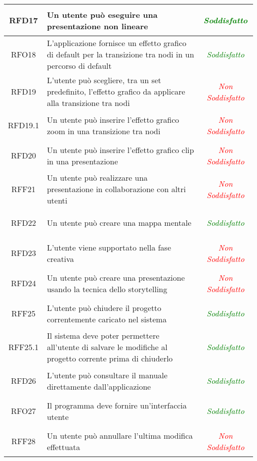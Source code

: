 \begin{longtable}{|c|>{\centering}m{7cm}|c|}
\hypertarget{RFD17}{RFD17} & Un utente può eseguire una presentazione non lineare & \textcolor{Green}{\textit{Soddisfatto}}\\ \hline
\hypertarget{RFO18}{RFO18} & L'applicazione fornisce un effetto grafico di default per la transizione tra nodi in un percorso di default & \textcolor{Green}{\textit{Soddisfatto}}\\ \hline
\hypertarget{RFD19}{RFD19} &  L'utente può scegliere, tra un set predefinito, l'effetto grafico da applicare alla transizione tra nodi & \textcolor{Red}{\textit{Non Soddisfatto}}\\ \hline
\hypertarget{RFD19.1}{RFD19.1} & Un utente può inserire l'effetto grafico zoom in una transizione tra nodi & \textcolor{Red}{\textit{Non Soddisfatto}}\\ \hline
\hypertarget{RFD20}{RFD20} & Un utente può inserire l'effetto grafico clip in una presentazione & \textcolor{Red}{\textit{Non Soddisfatto}}\\ \hline
\hypertarget{RFF21}{RFF21} & Un utente può realizzare una presentazione in collaborazione con altri utenti & \textcolor{Red}{\textit{Non Soddisfatto}}\\ \hline
\hypertarget{RFD22}{RFD22} & Un utente può creare una mappa mentale & \textcolor{Green}{\textit{Soddisfatto}}\\ \hline
\hypertarget{RFD23}{RFD23} & L'utente viene supportato nella fase creativa & \textcolor{Red}{\textit{Non Soddisfatto}}\\ \hline
\hypertarget{RFD24}{RFD24} & Un utente può creare una presentazione usando la tecnica dello storytelling & \textcolor{Red}{\textit{Non Soddisfatto}}\\ \hline
\hypertarget{RFF25}{RFF25} & L'utente può chiudere il progetto correntemente caricato nel sistema & \textcolor{Green}{\textit{Soddisfatto}}\\ \hline
\hypertarget{RFF25.1}{RFF25.1} & Il sistema deve poter permettere all'utente di salvare le modifiche al progetto corrente prima di chiuderlo & \textcolor{Green}{\textit{Soddisfatto}}\\ \hline
\hypertarget{RFD26}{RFD26} & L'utente può consultare il manuale direttamente dall'applicazione & \textcolor{Green}{\textit{Soddisfatto}}\\ \hline
\hypertarget{RFO27}{RFO27} & Il programma deve fornire un'interfaccia utente & \textcolor{Green}{\textit{Soddisfatto}}\\ \hline
\hypertarget{RFF28}{RFF28} & Un utente può annullare l'ultima modifica effettuata & \textcolor{Red}{\textit{Non Soddisfatto}}\\ \hline

\end{longtable}
